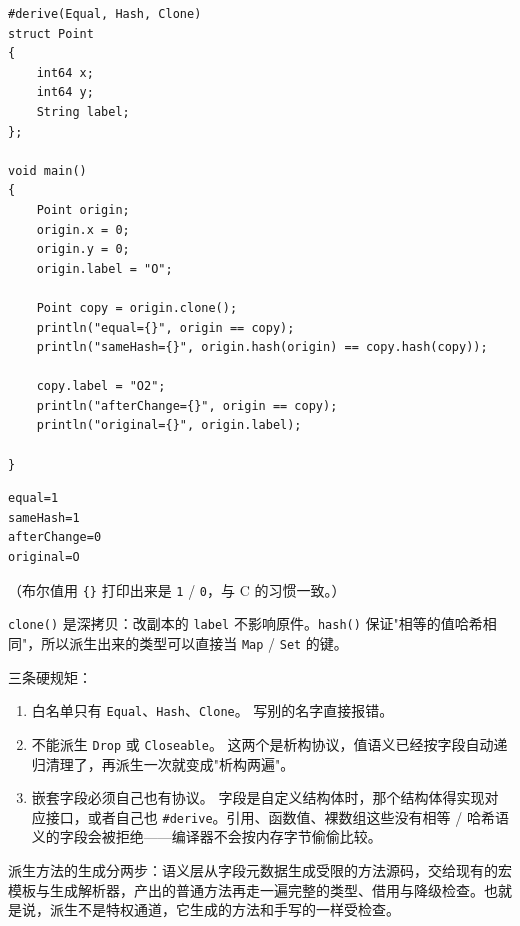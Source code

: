 \par
\medskip
\begin{lstlisting}[style=chali]
#derive(Equal, Hash, Clone)
struct Point
{
    int64 x;
    int64 y;
    String label;
};

void main()
{
    Point origin;
    origin.x = 0;
    origin.y = 0;
    origin.label = "O";

    Point copy = origin.clone();
    println("equal={}", origin == copy);
    println("sameHash={}", origin.hash(origin) == copy.hash(copy));

    copy.label = "O2";
    println("afterChange={}", origin == copy);
    println("original={}", origin.label);

}
\end{lstlisting}
\par
\medskip

\par
\medskip
\begin{lstlisting}[style=out]
equal=1
sameHash=1
afterChange=0
original=O
\end{lstlisting}
\par
\medskip

（布尔值用 \texttt{\{\}} 打印出来是 \texttt{1} / \texttt{0}，与 C 的习惯一致。）

\texttt{clone(\allowbreak{})\allowbreak{}} 是深拷贝：改副本的 \texttt{label} 不影响原件。\texttt{hash(\allowbreak{})\allowbreak{}} 保证"相等的值哈希相同"，所以派生出来的类型可以直接当 \texttt{Map} / \texttt{Set} 的键。

三条硬规矩：

\begin{enumerate}

\item 白名单只有 \texttt{Equal}、\texttt{Hash}、\texttt{Clone}。 写别的名字直接报错。

\item 不能派生 \texttt{Drop} 或 \texttt{Closeable}。 这两个是析构协议，值语义已经按字段自动递归清理了，再派生一次就变成"析构两遍"。

\item 嵌套字段必须自己也有协议。 字段是自定义结构体时，那个结构体得实现对应接口，或者自己也 \texttt{\#derive}。引用、函数值、裸数组这些没有相等 / 哈希语义的字段会被拒绝——编译器不会按内存字节偷偷比较。

\end{enumerate}

派生方法的生成分两步：语义层从字段元数据生成受限的方法源码，交给现有的宏模板与生成解析器，产出的普通方法再走一遍完整的类型、借用与降级检查。也就是说，派生不是特权通道，它生成的方法和手写的一样受检查。


